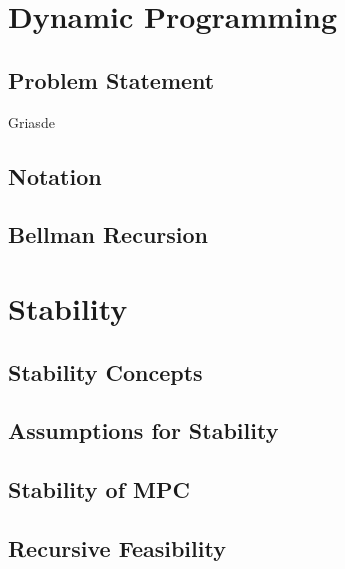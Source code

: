 \documentclass[english]{latex4ei/latex4ei_sheet}
\begin{document}
\section{Dynamic Programming}
\begin{sectionbox}

\subsection{Problem Statement}
\begin{emphbox}
    Griasde
\end{emphbox}

\subsection{Notation}

\subsection{Bellman Recursion}

\end{sectionbox}

\section{Stability}
\begin{sectionbox}

\subsection{Stability Concepts}

\subsection{Assumptions for Stability}

\subsection{Stability of MPC}

\subsection{Recursive Feasibility}

\end{sectionbox}
\end{document}

